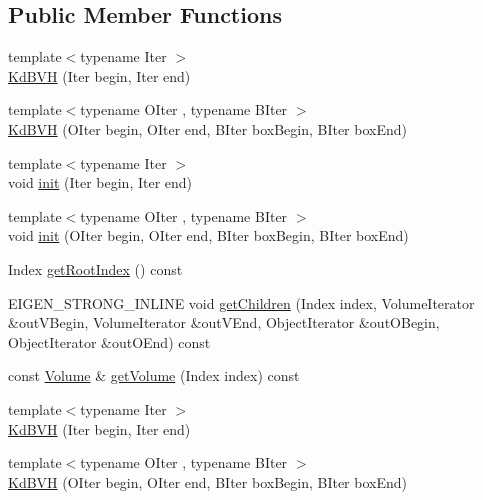 \subsection*{Public Member Functions}
\begin{DoxyCompactItemize}
\item 
{\footnotesize template$<$typename Iter $>$ }\\\hyperlink{class_eigen_1_1_kd_b_v_h_a87d240e2d6ac5e87fc2e4ae6e0fe4bdc}{Kd\+B\+VH} (Iter begin, Iter end)
\item 
{\footnotesize template$<$typename O\+Iter , typename B\+Iter $>$ }\\\hyperlink{class_eigen_1_1_kd_b_v_h_a94f781127eeec80a7659b8a625e2fa94}{Kd\+B\+VH} (O\+Iter begin, O\+Iter end, B\+Iter box\+Begin, B\+Iter box\+End)
\item 
{\footnotesize template$<$typename Iter $>$ }\\void \hyperlink{class_eigen_1_1_kd_b_v_h_a431eed3c2567a854fb350f0b327d3307}{init} (Iter begin, Iter end)
\item 
{\footnotesize template$<$typename O\+Iter , typename B\+Iter $>$ }\\void \hyperlink{class_eigen_1_1_kd_b_v_h_a10a9c8f6d596d7a2cd285a3fb3e8c053}{init} (O\+Iter begin, O\+Iter end, B\+Iter box\+Begin, B\+Iter box\+End)
\item 
Index \hyperlink{class_eigen_1_1_kd_b_v_h_a8111486ece7980dd8f0d10aff9693d11}{get\+Root\+Index} () const
\item 
E\+I\+G\+E\+N\+\_\+\+S\+T\+R\+O\+N\+G\+\_\+\+I\+N\+L\+I\+NE void \hyperlink{class_eigen_1_1_kd_b_v_h_a67326b18fcf16f341d2e4a16006d0205}{get\+Children} (Index index, Volume\+Iterator \&out\+V\+Begin, Volume\+Iterator \&out\+V\+End, Object\+Iterator \&out\+O\+Begin, Object\+Iterator \&out\+O\+End) const
\item 
const \hyperlink{group___geometry___module_class_eigen_1_1_aligned_box}{Volume} \& \hyperlink{class_eigen_1_1_kd_b_v_h_a59e7a2afb19fe7ae919fb95425bd6bf0}{get\+Volume} (Index index) const
\item 
{\footnotesize template$<$typename Iter $>$ }\\\hyperlink{class_eigen_1_1_kd_b_v_h_a87d240e2d6ac5e87fc2e4ae6e0fe4bdc}{Kd\+B\+VH} (Iter begin, Iter end)
\item 
{\footnotesize template$<$typename O\+Iter , typename B\+Iter $>$ }\\\hyperlink{class_eigen_1_1_kd_b_v_h_a94f781127eeec80a7659b8a625e2fa94}{Kd\+B\+VH} (O\+Iter begin, O\+Iter end, B\+Iter box\+Begin, B\+Iter box\+End)

\end{DoxyCompactItemize}
